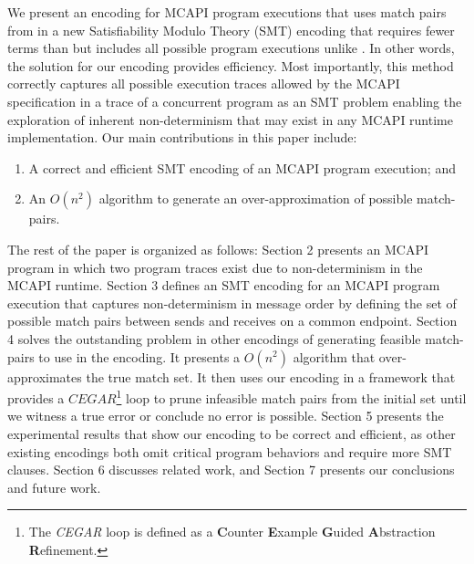 We present an encoding for MCAPI program executions that uses match pairs from \cite{sharma:fmcad09} in a new Satisfiability Modulo Theory (SMT) encoding that requires fewer terms than \cite{elwakil:padtad10} but includes all possible program executions unlike \cite{elwakil:padtad10}. In other words, the solution for our encoding provides efficiency. Most importantly, this method correctly captures all possible execution traces allowed by the MCAPI specification in a trace of a concurrent program as an SMT problem enabling the exploration of inherent non-determinism that may exist in any MCAPI runtime implementation.
Our main contributions in this paper include:

\begin{enumerate}
\item A correct and efficient SMT encoding of an MCAPI program execution; and
\item  An $O(n^2)$ algorithm to generate an over-approximation of possible match-pairs.
\end{enumerate}

The rest of the paper is organized as follows:
Section 2 presents an MCAPI program in which two program traces exist due to non-determinism in the MCAPI runtime. Section 3 defines an SMT encoding for an MCAPI program execution that captures non-determinism in message order by defining the set of possible match pairs between sends and receives on a common endpoint. Section 4 solves the outstanding problem in other encodings of generating feasible match-pairs to use in the encoding. It presents a $O(n^2)$ algorithm that over-approximates the true match set. It then uses our encoding in a framework that provides a $\mathit{CEGAR}$\footnote{The \textit{CEGAR} loop is defined as a \textbf{C}ounter \textbf{E}xample \textbf{G}uided \textbf{A}bstraction \textbf{R}efinement.} loop to prune infeasible match pairs from the initial set until we witness a true error or conclude no error is possible. Section 5 presents the experimental results that show our encoding to be correct and efficient, as other existing encodings both omit critical program behaviors and require more SMT clauses. Section 6 discusses related
work, and Section 7  presents our conclusions and future work.


